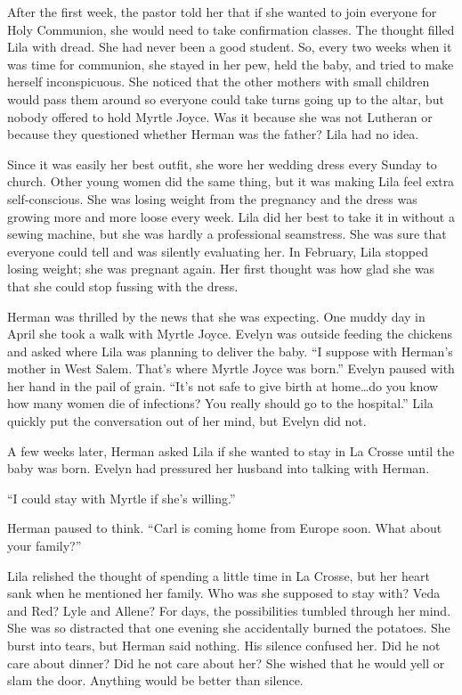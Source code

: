 \documentclass[
  american,
  letterpaper,
]{book}
\begin{document}
After the first week, the pastor told her that if she wanted to join
everyone for Holy Communion, she would need to take confirmation
classes. The thought filled Lila with dread. She had never been a good
student. So, every two weeks when it was time for communion, she stayed
in her pew, held the baby, and tried to make herself inconspicuous. She
noticed that the other mothers with small children would pass them
around so everyone could take turns going up to the altar, but nobody
offered to hold Myrtle Joyce. Was it because she was not Lutheran or
because they questioned whether Herman was the father? Lila had no idea.

Since it was easily her best outfit, she wore her wedding dress every
Sunday to church. Other young women did the same thing, but it was
making Lila feel extra self-conscious. She was losing weight from the
pregnancy and the dress was growing more and more loose every week. Lila
did her best to take it in without a sewing machine, but she was hardly
a professional seamstress. She was sure that everyone could tell and was
silently evaluating her. In February, Lila stopped losing weight; she
was pregnant again. Her first thought was how glad she was that she
could stop fussing with the dress.

Herman was thrilled by the news that she was expecting. One muddy day in
April she took a walk with Myrtle Joyce. Evelyn was outside feeding the
chickens and asked where Lila was planning to deliver the baby. ``I
suppose with Herman's mother in West Salem. That's where Myrtle Joyce
was born.'' Evelyn paused with her hand in the pail of grain. ``It's not
safe to give birth at home\ldots do you know how many women die of
infections? You really should go to the hospital.'' Lila quickly put the
conversation out of her mind, but Evelyn did not.

A few weeks later, Herman asked Lila if she wanted to stay in La Crosse
until the baby was born. Evelyn had pressured her husband into talking
with Herman.

``I could stay with Myrtle if she's willing.''

Herman paused to think. ``Carl is coming home from Europe soon. What
about your family?''

Lila relished the thought of spending a little time in La Crosse, but
her heart sank when he mentioned her family. Who was she supposed to
stay with? Veda and Red? Lyle and Allene? For days, the possibilities
tumbled through her mind. She was so distracted that one evening she
accidentally burned the potatoes. She burst into tears, but Herman said
nothing. His silence confused her. Did he not care about dinner? Did he
not care about her? She wished that he would yell or slam the door.
Anything would be better than silence.
\end{document}

